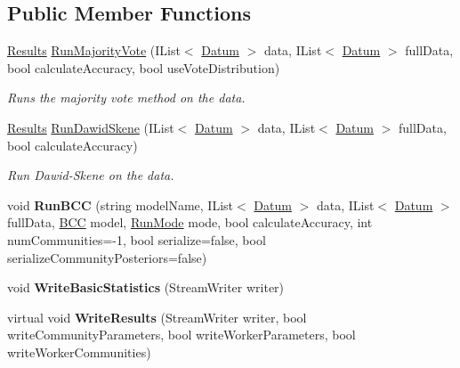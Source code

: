 \subsection*{Public Member Functions}
\begin{DoxyCompactItemize}
\item 
\hyperlink{class_crowdsourcing_models_1_1_results}{Results} \hyperlink{class_crowdsourcing_models_1_1_results_a9675f99c4cd7bfbe2229bc779fd1fab3}{Run\+Majority\+Vote} (I\+List$<$ \hyperlink{class_crowdsourcing_models_1_1_datum}{Datum} $>$ data, I\+List$<$ \hyperlink{class_crowdsourcing_models_1_1_datum}{Datum} $>$ full\+Data, bool calculate\+Accuracy, bool use\+Vote\+Distribution)
\begin{DoxyCompactList}\small\item\em Runs the majority vote method on the data. \end{DoxyCompactList}\item 
\hyperlink{class_crowdsourcing_models_1_1_results}{Results} \hyperlink{class_crowdsourcing_models_1_1_results_a1b0640e55fe37434f6afb2baad374519}{Run\+Dawid\+Skene} (I\+List$<$ \hyperlink{class_crowdsourcing_models_1_1_datum}{Datum} $>$ data, I\+List$<$ \hyperlink{class_crowdsourcing_models_1_1_datum}{Datum} $>$ full\+Data, bool calculate\+Accuracy)
\begin{DoxyCompactList}\small\item\em Run Dawid-\/\+Skene on the data. \end{DoxyCompactList}\item 
\hypertarget{class_crowdsourcing_models_1_1_results_a9604afa801fe1c5d55429f67043dd135}{}void {\bfseries Run\+B\+C\+C} (string model\+Name, I\+List$<$ \hyperlink{class_crowdsourcing_models_1_1_datum}{Datum} $>$ data, I\+List$<$ \hyperlink{class_crowdsourcing_models_1_1_datum}{Datum} $>$ full\+Data, \hyperlink{class_crowdsourcing_models_1_1_b_c_c}{B\+C\+C} model, \hyperlink{namespace_crowdsourcing_models_ac2299b85781ea82aa2c8850723c8a063}{Run\+Mode} mode, bool calculate\+Accuracy, int num\+Communities=-\/1, bool serialize=false, bool serialize\+Community\+Posteriors=false)\label{class_crowdsourcing_models_1_1_results_a9604afa801fe1c5d55429f67043dd135}

\item 
\hypertarget{class_crowdsourcing_models_1_1_results_a0741d9be4c6af7f634d7f88df02ac2c0}{}void {\bfseries Write\+Basic\+Statistics} (Stream\+Writer writer)\label{class_crowdsourcing_models_1_1_results_a0741d9be4c6af7f634d7f88df02ac2c0}

\item 
\hypertarget{class_crowdsourcing_models_1_1_results_a4aacf633a2db5d0bf1df5d2d5e9b62e2}{}virtual void {\bfseries Write\+Results} (Stream\+Writer writer, bool write\+Community\+Parameters, bool write\+Worker\+Parameters, bool write\+Worker\+Communities)\label{class_crowdsourcing_models_1_1_results_a4aacf633a2db5d0bf1df5d2d5e9b62e2}


\end{DoxyCompactItemize}
